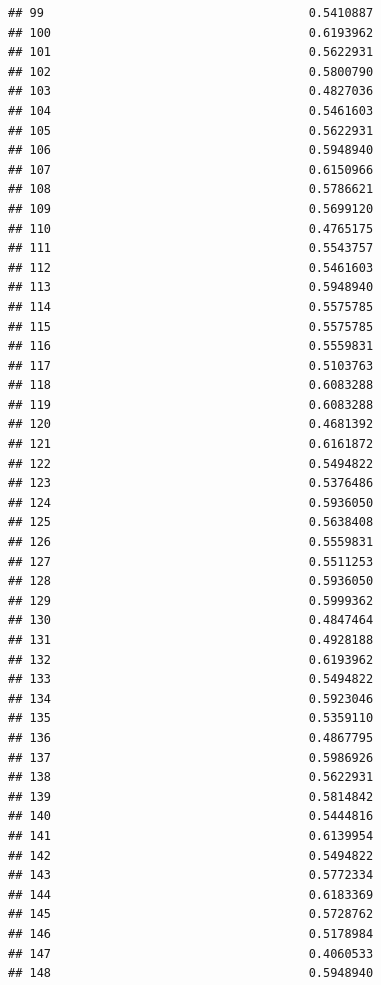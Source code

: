 \documentclass[
  american,
  man,floatsintext]{apa7}
\begin{document}
\begin{verbatim}
## 99                                     0.5410887
## 100                                    0.6193962
## 101                                    0.5622931
## 102                                    0.5800790
## 103                                    0.4827036
## 104                                    0.5461603
## 105                                    0.5622931
## 106                                    0.5948940
## 107                                    0.6150966
## 108                                    0.5786621
## 109                                    0.5699120
## 110                                    0.4765175
## 111                                    0.5543757
## 112                                    0.5461603
## 113                                    0.5948940
## 114                                    0.5575785
## 115                                    0.5575785
## 116                                    0.5559831
## 117                                    0.5103763
## 118                                    0.6083288
## 119                                    0.6083288
## 120                                    0.4681392
## 121                                    0.6161872
## 122                                    0.5494822
## 123                                    0.5376486
## 124                                    0.5936050
## 125                                    0.5638408
## 126                                    0.5559831
## 127                                    0.5511253
## 128                                    0.5936050
## 129                                    0.5999362
## 130                                    0.4847464
## 131                                    0.4928188
## 132                                    0.6193962
## 133                                    0.5494822
## 134                                    0.5923046
## 135                                    0.5359110
## 136                                    0.4867795
## 137                                    0.5986926
## 138                                    0.5622931
## 139                                    0.5814842
## 140                                    0.5444816
## 141                                    0.6139954
## 142                                    0.5494822
## 143                                    0.5772334
## 144                                    0.6183369
## 145                                    0.5728762
## 146                                    0.5178984
## 147                                    0.4060533
## 148                                    0.5948940

\end{verbatim}
\end{document}
